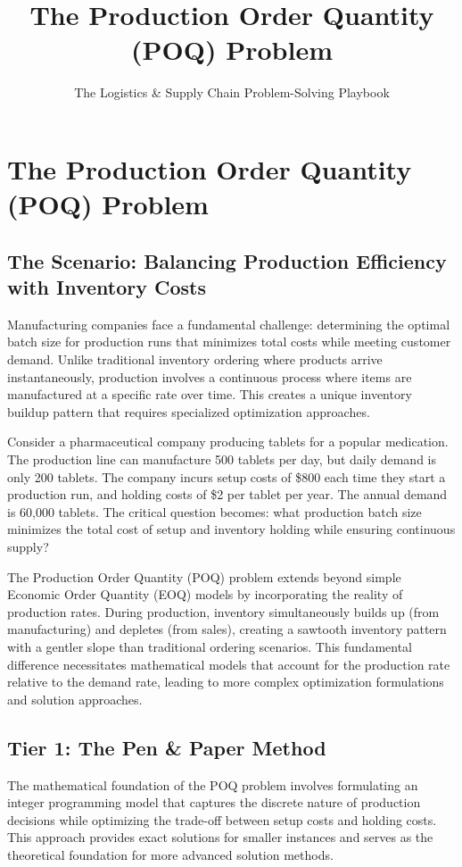 \documentclass{article}
\title{The Production Order Quantity (POQ) Problem}
\author{The Logistics \& Supply Chain Problem-Solving Playbook}
\date{}
\begin{document}
\maketitle

\section{The Production Order Quantity (POQ) Problem}

\subsection{The Scenario: Balancing Production Efficiency with Inventory Costs}

Manufacturing companies face a fundamental challenge: determining the optimal batch size for production runs that minimizes total costs while meeting customer demand. Unlike traditional inventory ordering where products arrive instantaneously, production involves a continuous process where items are manufactured at a specific rate over time. This creates a unique inventory buildup pattern that requires specialized optimization approaches.

Consider a pharmaceutical company producing tablets for a popular medication. The production line can manufacture 500 tablets per day, but daily demand is only 200 tablets. The company incurs setup costs of \$800 each time they start a production run, and holding costs of \$2 per tablet per year. The annual demand is 60,000 tablets. The critical question becomes: what production batch size minimizes the total cost of setup and inventory holding while ensuring continuous supply?

The Production Order Quantity (POQ) problem extends beyond simple Economic Order Quantity (EOQ) models by incorporating the reality of production rates. During production, inventory simultaneously builds up (from manufacturing) and depletes (from sales), creating a sawtooth inventory pattern with a gentler slope than traditional ordering scenarios. This fundamental difference necessitates mathematical models that account for the production rate relative to the demand rate, leading to more complex optimization formulations and solution approaches.

\subsection{Tier 1: The Pen \& Paper Method}

The mathematical foundation of the POQ problem involves formulating an integer programming model that captures the discrete nature of production decisions while optimizing the trade-off between setup costs and holding costs. This approach provides exact solutions for smaller instances and serves as the theoretical foundation for more advanced solution methods.
\end{document}
